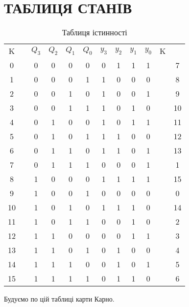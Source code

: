 \documentclass[a4paper,14pt]{extreport}
\begin{document}
\begin{figure}[h!]
\end{figure}

\chapter{  ТАБЛИЦЯ СТАНIВ   }
\begin{table}[h!]

\begin{center}


\begin{tabular}{c|ccccc|ccccc|c}
K && $Q_{3}$ & $Q_{2}$ & $Q_{1}$ & $Q_{0}$ & $  y_{3}$ & $y_{2}$ & $y_{1}  $ & $y_{0}$& K\\
 0 && 0 & 0 & 0 & 0 & 0 & 1 & 1 & 1   &&7 \\
1 && 0 & 0 & 0 & 1 & 1 & 0 & 0 & 0 &&  8  \\
2 && 0 & 0 & 1 & 0 & 1 & 0 & 0 & 1 &&  9  \\
3 && 0 & 0 & 1 & 1 & 1 & 0 & 1 & 0 &&  10 \\
4 && 0 & 1 & 0 & 0 & 1 & 0 & 1 & 1 &&  11 \\
5 && 0 & 1 & 0 & 1 & 1 & 1 & 0 & 0 &&  12 \\
6 && 0 & 1 & 1 & 0 & 1 & 1 & 0 & 1 &&  13 \\
7 && 0 & 1 & 1 & 1 & 0 & 0 & 0 & 1 &&  1  \\
8 && 1 & 0 & 0 & 0 & 1 & 1 & 1 & 1 &&  15 \\
9 && 1 & 0 & 0 & 1 & 0 & 0 & 0 & 0 &&  0  \\
10&& 1 & 0 & 1 & 0 & 1 & 1 & 1 & 0 &&  14 \\
11&& 1 & 0 & 1 & 1 & 0 & 0 & 1 & 0 &&  2  \\
12&& 1 & 1 & 0 & 0 & 0 & 0 & 1 & 1 &&  3  \\
13&& 1 & 1 & 0 & 1 & 0 & 1 & 0 & 0 &&  4  \\
14&& 1 & 1 & 1 & 0 & 0 & 1 & 0 & 1 &&  5  \\
15&& 1 & 1 & 1 & 1 & 0 & 1 & 1 & 0 &&  6  \\
\end{tabular}

\caption{Таблиця істинності }
\end{center}
\end{table}
\vspace{1cm}
Будуємо по цій таблиці карти Карно.\\ 
\end{document}
